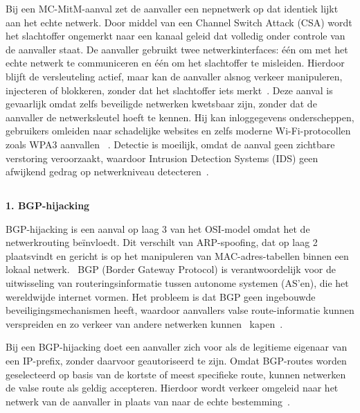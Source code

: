 Bij een MC-MitM-aanval zet de aanvaller een nepnetwerk op dat identiek lijkt aan het echte netwerk. Door middel van een Channel Switch Attack (CSA) wordt het slachtoffer ongemerkt naar een kanaal geleid dat volledig onder controle van de aanvaller staat. De aanvaller gebruikt twee netwerkinterfaces: één om met het echte netwerk te communiceren en één om het slachtoffer te misleiden. Hierdoor blijft de versleuteling actief, maar kan de aanvaller alsnog verkeer manipuleren, injecteren of blokkeren, zonder dat het slachtoffer iets merkt~\autocite{THANKAPPAN2022}.
Deze aanval is gevaarlijk omdat zelfs beveiligde netwerken kwetsbaar zijn, zonder dat de aanvaller de netwerksleutel hoeft te kennen. Hij kan inloggegevens onderscheppen, gebruikers omleiden naar schadelijke websites en zelfs moderne Wi-Fi-protocollen zoals WPA3 aanvallen ~\autocite{THANKAPPAN2022}.
Detectie is moeilijk, omdat de aanval geen zichtbare verstoring veroorzaakt, waardoor Intrusion Detection Systems (IDS) geen afwijkend gedrag op netwerkniveau detecteren~\autocite{THANKAPPAN2022}.



\subsection{}
\label{sec:MitM-aanvallen op de netwerklaag}

\vspace{0.5cm}
\textbf{1. BGP-hijacking}

BGP-hijacking is een aanval op laag 3 van het OSI-model omdat het de netwerkrouting beïnvloedt. Dit verschilt van ARP-spoofing, dat op laag 2 plaatsvindt en gericht is op het manipuleren van MAC-adres-tabellen binnen een lokaal netwerk. 
BGP (Border Gateway Protocol) is verantwoordelijk voor de uitwisseling van routeringsinformatie tussen autonome systemen (AS’en), die het wereldwijde internet vormen. Het probleem is dat BGP geen ingebouwde beveiligingsmechanismen heeft, waardoor aanvallers valse route-informatie kunnen verspreiden en zo verkeer van andere netwerken kunnen  kapen~\autocite{bühler2023}.


Bij een BGP-hijacking doet een aanvaller zich voor als de legitieme eigenaar van een IP-prefix, zonder daarvoor geautoriseerd te zijn. Omdat BGP-routes worden geselecteerd op basis van de kortste of meest specifieke route, kunnen netwerken de valse route als geldig accepteren. Hierdoor wordt verkeer omgeleid naar het netwerk van de aanvaller in plaats van naar de echte bestemming~\autocite{bühler2023}.

